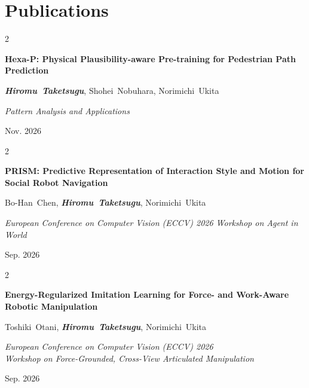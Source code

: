 \documentclass[10pt, letterpaper]{article}
\newenvironment{twocolentry}[2][]{
    \onecolentry
    \def\secondColumn{#2}
    \setcolumnwidth{\fill, 4.5 cm}
    \begin{paracol}{2}
}{
    \switchcolumn \raggedleft \secondColumn
    \end{paracol}
    \endonecolentry
} %
\begin{document}
    \section{Publications}
        \begin{samepage}
            \begin{twocolentry}{
                Nov. 2026
            }
                \textbf{Hexa-P: Physical Plausibility-aware Pre-training for Pedestrian Path Prediction}

                \vspace{0.10 cm}

                \mbox{\textbf{\textit{Hiromu Taketsugu}}}, \mbox{Shohei Nobuhara}, \mbox{Norimichi Ukita}
                \vspace{0.10 cm}

                \textit{Pattern Analysis and Applications}
            \end{twocolentry}
        \end{samepage}

        \vspace{0.2 cm}

        \begin{samepage}
            \begin{twocolentry}{
                Sep. 2026
            }
                \textbf{PRISM: Predictive Representation of Interaction Style and Motion for Social Robot Navigation}

                \vspace{0.10 cm}

                \mbox{Bo-Han Chen}, \mbox{\textbf{\textit{Hiromu Taketsugu}}}, \mbox{Norimichi Ukita}
                \vspace{0.10 cm}

                \textit{European Conference on Computer Vision (ECCV) 2026 Workshop on Agent in World}
            \end{twocolentry}
        \end{samepage}

        \vspace{0.2 cm}

        \begin{samepage}
            \begin{twocolentry}{
                Sep. 2026
            }
                \textbf{Energy-Regularized Imitation Learning for Force- and Work-Aware Robotic Manipulation}

                \vspace{0.10 cm}

                \mbox{Toshiki Otani}, \mbox{\textbf{\textit{Hiromu Taketsugu}}}, \mbox{Norimichi Ukita}
                \vspace{0.10 cm}

                \textit{European Conference on Computer Vision (ECCV) 2026\\ Workshop on Force-Grounded, Cross-View Articulated Manipulation}
            \end{twocolentry}
        \end{samepage}
\end{document}
